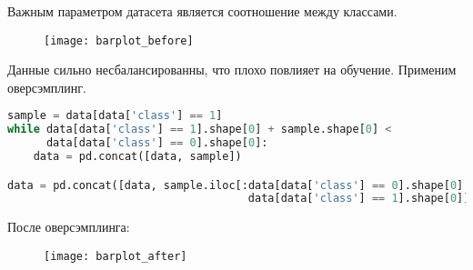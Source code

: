 Важным параметром датасета является соотношение между классами.

\begin{figure}[h]
\centering
\texttt{[image: barplot\_before]}
\end{figure}

Данные сильно несбалансированны, что плохо повлияет на обучение. Применим оверсэмплинг.

\begin{lstlisting}[language=python, keepspaces=true]
sample = data[data['class'] == 1]
while data[data['class'] == 1].shape[0] + sample.shape[0] < 
      data[data['class'] == 0].shape[0]:
    data = pd.concat([data, sample])

data = pd.concat([data, sample.iloc[:data[data['class'] == 0].shape[0] - 
                                     data[data['class'] == 1].shape[0]]])
\end{lstlisting}

После оверсэмплинга:

\begin{figure}[h]
\centering
\texttt{[image: barplot\_after]}
\end{figure}

\pagebreak

